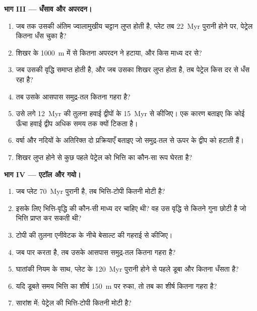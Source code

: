 \begin{problem}[{सप्ताहांत समस्या --- ज्वालामुखी से एटॉल तक}]
\noindent\textbf{भाग III --- धँसाव और अपरदन।}
\begin{enumerate}[resume]
  \item जब तक उसकी अंतिम ज्वालामुखीय चट्टान लुप्त होती है, प्लेट तब
        \qty{22}{Myr} पुरानी होने पर, पेट्रेल कितना धँस चुका है?
  \item शिखर के \qty{1000}{m} में से कितना अपरदन ने हटाया, और किस माध्य दर से?
  \item जब उसकी वृद्धि समाप्त होती है, और जब उसका शिखर लुप्त होता है, तब पेट्रेल किस दर से धँस रहा है?
  \item तब उसके आसपास समुद्र-तल कितना गहरा है?
  \item उसे लगे \qty{12}{Myr} की तुलना हवाई द्वीपों के \qty{15}{Myr} से कीजिए। एक
        कारण बताइए कि कोई ऊँचा हवाई द्वीप अधिक समय तक क्यों टिकता है।
  \item वर्षा और नदियों के अतिरिक्त दो प्रक्रियाएँ बताइए जो समुद्र-तल से ऊपर के द्वीप को हटाती हैं।
  \item शिखर लुप्त होने से कुछ पहले पेट्रेल को भित्ति का कौन-सा रूप घेरता है?
\end{enumerate}

\noindent\textbf{भाग IV --- एटॉल और गयो।}
\begin{enumerate}[resume]
  \item जब प्लेट \qty{70}{Myr} पुरानी है, तब भित्ति-टोपी कितनी मोटी है?
  \item इसके लिए भित्ति-वृद्धि की कौन-सी माध्य दर चाहिए थी? वह उस वृद्धि से कितने गुना छोटी है
        जो भित्ति प्राप्त कर सकती थी?
  \item टोपी की तुलना एनीवेटक के नीचे बेसाल्ट की गहराई से कीजिए।
  \item जब   पार करता है, तब उसके आसपास समुद्र-तल कितना गहरा है?
  \item घातांकी नियम के साथ, प्लेट के \qty{120}{Myr} पुरानी होने से पहले डूबा  और कितना
        धँसता है?
  \item यदि डूबते समय भित्ति का शीर्ष \qty{150}{m} पर रुका, तो तब  का शीर्ष कितना
        गहरा है?
  \item सारांश में: पेट्रेल  की भित्ति-टोपी कितनी मोटी है?
\end{enumerate}
\end{problem}
